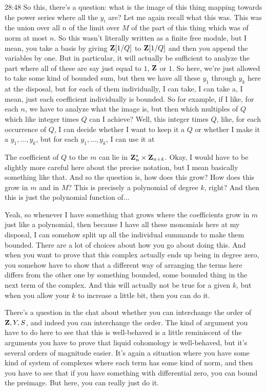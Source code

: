 \begin{unfinished}{28:48}
So this, there's a question: what is the image of this thing mapping towards the power series where all the $y_i$ are? Let me again recall what this was. This was the union over all $n$ of the limit over $M$ of the part of this thing which was of norm at most $n$. So this wasn't literally written as a finite free module, but I mean, you take a basis by giving $\mathbf Z[1/Q]$ to $\mathbf Z[1/Q]$ and then you append the variables by one. But in particular, it will actually be sufficient to analyze the part where all of these are say just equal to $1$, $\mathbf Z$ or $1$. So here, we're just allowed to take some kind of bounded sum, but then we have all these $y_1$ through $y_k$ here at the disposal, but for each of them individually, I can take, I can take a, I mean, just each coefficient individually is bounded. So for example, if I like, for each $n$, we have to analyze what the image is, but then which multiples of $Q$ which like integer times $Q$ can I achieve? Well, this integer times $Q$, like, for each occurrence of $Q$, I can decide whether I want to keep it a $Q$ or whether I make it a $y_1,...,y_k$, but for each $y_1,...,y_k$, I can use it at

The coefficient of $Q$ to the $m$ can lie in $\mathbf Z_n^* \times \mathbf Z_{n+k}$. Okay, I would have to be slightly more careful here about the precise notation, but I mean basically something like that. And so the question is, how does this grow? How does this grow in $m$ and in $M$? This is precisely a polynomial of degree $k$, right? And then this is just the polynomial function of...

Yeah, so whenever I have something that grows where the coefficients grow in $m$ just like a polynomial, then because I have all these monomials here at my disposal, I can somehow split up all the individual summands to make them bounded. There are a lot of choices about how you go about doing this. And when you want to prove that this complex actually ends up being in degree zero, you somehow have to show that a different way of arranging the terms here differs from the other one by something bounded, some bounded thing in the next term of the complex. And this will actually not be true for a given $k$, but when you allow your $k$ to increase a little bit, then you can do it.

There's a question in the chat about whether you can interchange the order of $\mathbf Z , Y ,S$, and indeed you can interchange the order. The kind of argument you have to do here to see that this is well-behaved is a little reminiscent of the arguments you have to prove that liquid cohomology is well-behaved, but it's several orders of magnitude easier. It's again a situation where you have some kind of system of complexes where each term has some kind of norm, and then you have to see that if you have something with differential zero, you can bound the preimage. But here, you can really just do it.


\end{unfinished}
